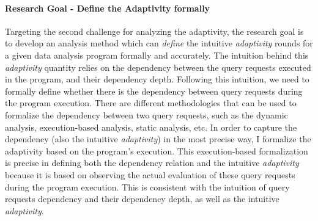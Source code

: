 \paragraph{Research Goal - Define the Adaptivity formally}
Targeting the second challenge
for analyzing the adaptivity, 
the research goal is to develop an analysis method which can
\emph{define} the intuitive \emph{adaptivity} rounds for a given data analysis program formally and accurately.
The intuition behind this \emph{adaptivity} quantity relies on the dependency between the query requests 
executed in the program, and their dependency depth. 
Following this intuition, we need to formally define whether there is the dependency between query requests during the program
execution.
%
There are different methodologies that can be used to formalize the dependency between two query requests, such as the 
dynamic analysis, execution-based analysis, static analysis, etc.
%
In order to capture the dependency (also the intuitive \emph{adaptivity}) in the most precise way,
I formalize the adaptivity based on the program's execution.
%
This execution-based
formalization is precise in defining both the dependency relation
and the intuitive \emph{adaptivity} because it is
based on observing the actual evaluation of these query requests during the 
program execution. This is consistent with the intuition of query requests dependency and their dependency depth,
as well as the intuitive
\emph{adaptivity}.
